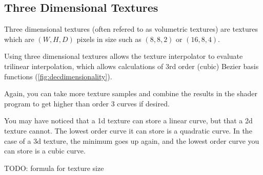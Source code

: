 \documentclass{jcgt}
\begin{document}
\subsection{Three Dimensional Textures}

Three dimensional textures (often refered to as volumetric textures) are textures which are $(W,H,D)$ pixels in size such as $(8,8,2)$ or $(16,8,4)$.

Using three dimensional textures allows the texture interpolator to evaluate trilinear interpolation, which allows calculations of 3rd order (cubic) Bezier basis functions (\autoref{fig:decdimensionality}).

Again, you can take more texture samples and combine the results in the shader program to get higher than order 3 curves if desired.

You may have noticed that a 1d texture can store a linear curve, but that a 2d texture cannot.  The lowest order curve it can store is a quadratic curve.  In the case of a 3d texture, the minimum goes up again, and the lowest order curve you can store is a cubic curve.

TODO: formula for texture size
\end{document}
